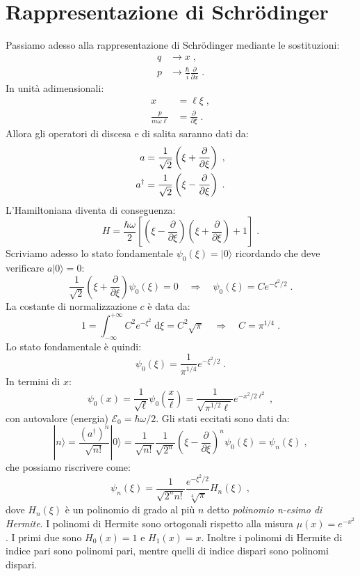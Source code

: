 \documentclass[10pt,a4paper]{report}
\theoremstyle{definition}
\numberwithin{equation}{section}
\newcommand{\diff}[1][]{\mathrm{d}#1}
\newcommand{\ket}{\rangle}
\newcommand{\Sch}{Schrödinger}
\newcommand{\adj}[1]{#1^{\dagger}}
\begin{document}
\section{Rappresentazione di \Sch}
Passiamo adesso alla rappresentazione di \Sch\; mediante le sostituzioni:
\begin{align*}
q &\longrightarrow x \;,\\
p &\longrightarrow \frac{\hbar}{i}\frac{\partial}{\partial x}\;.
\end{align*}
In unità adimensionali:
\begin{align*}
x&=\ell\xi\;, \\
\frac{p}{m\omega\ell}&= \frac{\partial}{\partial\xi}\;.
\end{align*}
Allora gli operatori di discesa e di salita saranno dati da:
\begin{align}
a&=\frac{1}{\sqrt{2}}\left(\xi+\frac{\partial}{\partial\xi}\right)\;, \notag \\
\adj{a}&=\frac{1}{\sqrt{2}}\left(\xi-\frac{\partial}{\partial\xi}\right)\;.
\end{align}
L'Hamiltoniana diventa di conseguenza:
\begin{equation}
H=\frac{\hbar\omega}{2}\left[\left(\xi-\frac{\partial}{\partial\xi}\right)\left(\xi+\frac{\partial}{\partial\xi}\right)+1\right]\;.
\end{equation}
Scriviamo adesso lo stato fondamentale $\psi_0(\xi)=|0\ket$ ricordando che deve verificare $a|0\ket=0$:
\begin{equation}
\frac{1}{\sqrt{2}}\left(\xi+\frac{\partial}{\partial\xi}\right)\psi_0(\xi)=0\quad  \Longrightarrow \quad \psi_0(\xi)=Ce^{-\xi^2/2}\;.
\end{equation}
La costante di normalizzazione $c$ è data da:
$$
1=\int_{-\infty}^{+\infty}C^2e^{-\xi^2}\;\diff{\xi}=C^2\sqrt{\pi}\quad \Longrightarrow \quad C=\pi^{1/4}\;.
$$
Lo stato fondamentale è quindi:
\begin{equation}
\psi_0(\xi)=\frac{1}{\pi^{1/4}}e^{-\xi^2/2}\;.
\end{equation}
In termini di $x$:
\begin{equation}
\psi_0(x)=\frac{1}{\sqrt{\ell}}\psi_0\left(\frac{x}{\ell}\right)=\frac{1}{\sqrt{\pi^{1/2}\ell}}e^{-x^2/2\ell^2}\;,
\end{equation}
con autovalore (energia) $\mathcal{E}_0=\hbar\omega/2$. Gli stati eccitati sono dati da:
\begin{equation}
|n\ket=\frac{(\adj{a})^n}{\sqrt{n!}}|0\ket=\frac{1}{\sqrt{n!}}\frac{1}{\sqrt{2^n}}\left(\xi-\frac{\partial}{\partial\xi}\right)^n\psi_0(\xi)=\psi_n(\xi)\;,
\end{equation}
che possiamo riscrivere come:
\begin{equation}
\psi_n(\xi)=\frac{1}{\sqrt{2^n n!}}\frac{e^{-\xi^2/2}}{\sqrt[4]{\pi}}H_n(\xi)\;,
\end{equation}
dove $H_n(\xi)$ è un polinomio di grado al più $n$ detto \textit{polinomio n-esimo di Hermite}. I polinomi di Hermite sono ortogonali rispetto alla misura $\mu(x)=e^{-x^2}$. I primi due sono $H_0(x)=1$ e $H_1(x)=x$. Inoltre i polinomi di Hermite di indice pari sono polinomi pari, mentre quelli di indice dispari sono polinomi dispari.
\end{document}

